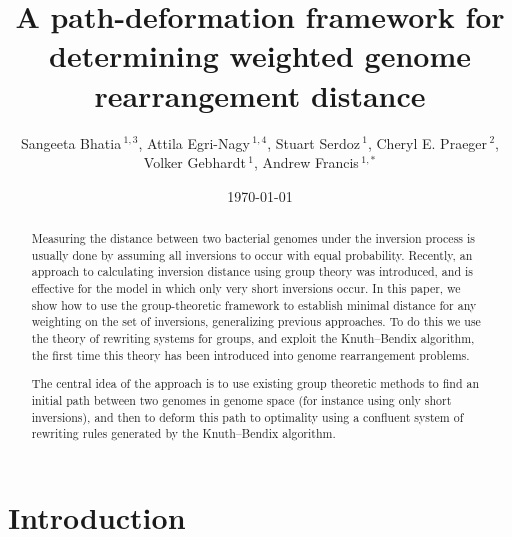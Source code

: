 \documentclass[12pt,a4paper]{amsart}
\numberwithin{equation}{section}
\begin{document}
\title[Weighted genome rearrangement distance]{A path-deformation framework for determining weighted genome rearrangement distance}

\author[Bhatia et al]{Sangeeta Bhatia\,$^{1,3}$, Attila Egri-Nagy\,$^{1,4}$, Stuart Serdoz\,$^{1}$, Cheryl E. Praeger\,$^{2}$, Volker Gebhardt\,$^{1}$, Andrew Francis\,$^{1,*}$}
%
\address{$^{1}$Centre for Research in Mathematics and Data Science, Western Sydney University, Sydney, NSW, Australia \\
$^{2}$School of Physics, Mathematics, and Computing, University of Western Australia, Perth, WA, Australia\\
$^{3}$current address: MRC Centre for Global Infectious Disease Analysis, School of Public Health, Imperial College London, UK\\
$^{4}$current address: Akita International University, Japan\\ 
$^*$Corresponding author.} 

\begin{abstract}
Measuring the distance between two bacterial genomes under the inversion process is usually done by assuming all inversions to occur with equal probability.  Recently, an approach to calculating inversion distance using group theory was introduced, and is effective for the model in which only very short inversions occur.  In this paper, we show how to use the group-theoretic framework to establish minimal distance for any weighting on the set of inversions, generalizing previous approaches.  To do this we use the theory of rewriting systems for groups, and exploit the Knuth--Bendix algorithm, the first time this theory has been introduced into genome rearrangement problems.  

The central idea of the approach is to use existing group theoretic methods to find an initial path between two genomes in genome space (for instance using only short inversions), and then to deform this path to optimality using a confluent system of rewriting rules generated by the Knuth--Bendix algorithm.
\end{abstract}
\date{\today}
\maketitle

\section{Introduction}
\label{sec:intro}
\end{document}
